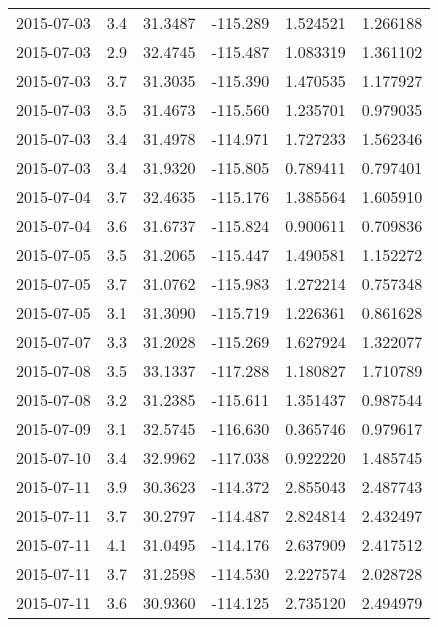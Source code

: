 \begin{tabular}{lrrrrr}
2015-07-03 &       3.4 &  31.3487 &  -115.289 &         1.524521 &         1.266188 \\
2015-07-03 &       2.9 &  32.4745 &  -115.487 &         1.083319 &         1.361102 \\
2015-07-03 &       3.7 &  31.3035 &  -115.390 &         1.470535 &         1.177927 \\
2015-07-03 &       3.5 &  31.4673 &  -115.560 &         1.235701 &         0.979035 \\
2015-07-03 &       3.4 &  31.4978 &  -114.971 &         1.727233 &         1.562346 \\
2015-07-03 &       3.4 &  31.9320 &  -115.805 &         0.789411 &         0.797401 \\
2015-07-04 &       3.7 &  32.4635 &  -115.176 &         1.385564 &         1.605910 \\
2015-07-04 &       3.6 &  31.6737 &  -115.824 &         0.900611 &         0.709836 \\
2015-07-05 &       3.5 &  31.2065 &  -115.447 &         1.490581 &         1.152272 \\
2015-07-05 &       3.7 &  31.0762 &  -115.983 &         1.272214 &         0.757348 \\
2015-07-05 &       3.1 &  31.3090 &  -115.719 &         1.226361 &         0.861628 \\
2015-07-07 &       3.3 &  31.2028 &  -115.269 &         1.627924 &         1.322077 \\
2015-07-08 &       3.5 &  33.1337 &  -117.288 &         1.180827 &         1.710789 \\
2015-07-08 &       3.2 &  31.2385 &  -115.611 &         1.351437 &         0.987544 \\
2015-07-09 &       3.1 &  32.5745 &  -116.630 &         0.365746 &         0.979617 \\
2015-07-10 &       3.4 &  32.9962 &  -117.038 &         0.922220 &         1.485745 \\
2015-07-11 &       3.9 &  30.3623 &  -114.372 &         2.855043 &         2.487743 \\
2015-07-11 &       3.7 &  30.2797 &  -114.487 &         2.824814 &         2.432497 \\
2015-07-11 &       4.1 &  31.0495 &  -114.176 &         2.637909 &         2.417512 \\
2015-07-11 &       3.7 &  31.2598 &  -114.530 &         2.227574 &         2.028728 \\
2015-07-11 &       3.6 &  30.9360 &  -114.125 &         2.735120 &         2.494979 \\

\end{tabular}
